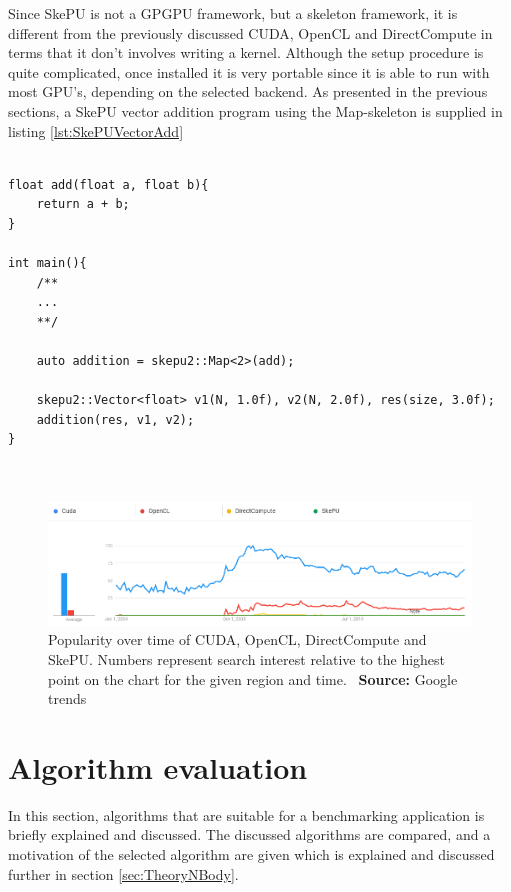 Since SkePU is not a GPGPU framework, but a skeleton framework, it is different from the previously discussed CUDA, OpenCL and DirectCompute in terms that it don't involves writing a kernel. Although the setup procedure is quite complicated, once installed it is very portable since it is able to run with most GPU's, depending on the selected backend. As presented in the previous sections, a SkePU vector addition program using the Map-skeleton is supplied in listing \ref{lst:SkePUVectorAdd}

\begin{lstlisting}[caption={SkePU vector addition}, label={lst:SkePUVectorAdd}, frame=single] 

float add(float a, float b){
	return a + b;
}

int main(){
    /**
    ...
    **/
    
    auto addition = skepu2::Map<2>(add);
    
    skepu2::Vector<float> v1(N, 1.0f), v2(N, 2.0f), res(size, 3.0f);
    addition(res, v1, v2);
}



\end{lstlisting}

\begin{figure}[!htbp]
    \centering
    \includegraphics[width=\textwidth]{Theory/Figs/GoogleTrendsComparison.png}
    \caption{Popularity over time of CUDA, OpenCL, DirectCompute and SkePU. Numbers represent search interest relative to the highest point on the chart for the given region and time. \ \textbf{Source:} Google trends}
    \label{fig:GoogleTrendsPopularity}
\end{figure}



\section{Algorithm evaluation}
In this section, algorithms that are suitable for a benchmarking application is briefly explained and discussed. The discussed algorithms are compared, and a motivation of the selected algorithm are given which is explained and discussed further in section \ref{sec:TheoryNBody}.

